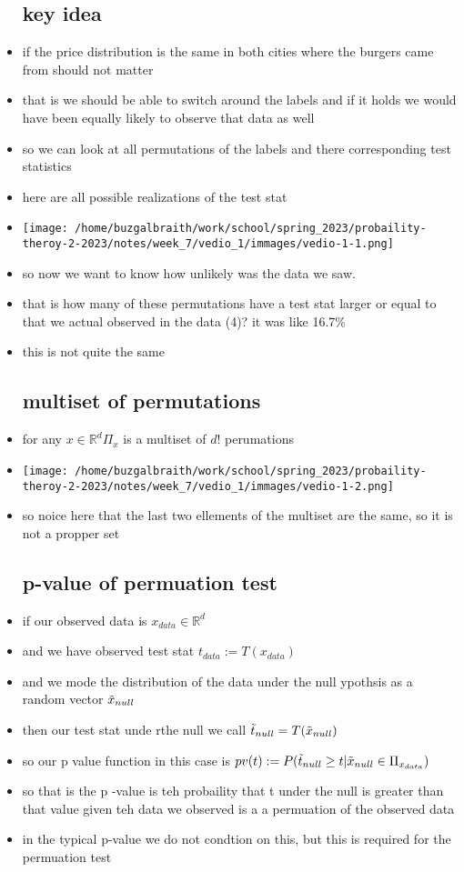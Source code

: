 \documentclass{article}
\begin{document}
\begin{itemize}
\subsection{key idea}
\item if the price distribution is the same in both cities where the burgers came from should not matter
\item that is we should be able to switch around the labels and if it holds we would have been 
equally likely to observe that data as well
\item so we can look at all permutations of the labels and there corresponding test statistics
\item here are all possible realizations of the test stat 
\item \texttt{[image: /home/buzgalbraith/work/school/spring\_2023/probaility-theroy-2-2023/notes/week\_7/vedio\_1/immages/vedio-1-1.png]}
\item so now we want to know how unlikely was the data we saw. 
\item that is how many of these permutations have a test stat larger or equal to that we actual observed in the data (4)? it was like 16.7\%
\item this is not quite the same 
\subsection{multiset of permutations}
\item for any $x\in \mathbb{R}^{d}\Pi_{x}$ is a multiset of $d!$ perumations
\item \texttt{[image: /home/buzgalbraith/work/school/spring\_2023/probaility-theroy-2-2023/notes/week\_7/vedio\_1/immages/vedio-1-2.png]}
\item so noice here that the last two ellements of the multiset are the same, so it is not a propper set 
\subsection{p-value of permuation test}
\item if our observed data is $x_{data}\in \mathbb{R}^{d}$
\item and we have observed test stat $t_{data}:=T(x_{data})$
\item and we mode the distribution of the data under the null ypothsis as a random vector $\Tilde{x}_{null}$
\item then our test stat unde rthe null we call $\Tilde{t}_{null}=T(\Tilde{x}_{null})$
\item so our p value function in this case is $pv(t):=P(\Tilde{t}_{null}\geq t |\Tilde{x}_{null}\in \Pi_{x_{data}})$
\item so that is the p -value is teh probaility that t under the null is greater than that value given teh data we observed is a a permuation of the observed data
\item in the typical p-value we do not condtion on this, but this is required for the permuation test 

\end{itemize}
\end{document}
